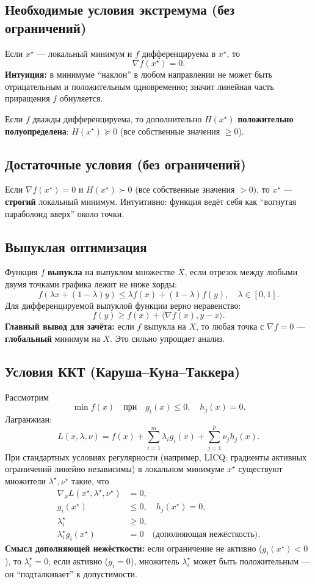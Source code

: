 \documentclass[12pt,a4paper]{article}
\newcommand{\grad}{\nabla}
\begin{document}
\subsection{Необходимые условия экстремума (без ограничений)}
Если \(x^\star\) --- локальный минимум и \(f\) дифференцируема в \(x^\star\), то
\[
  \grad f(x^\star)=0.
\]
\textbf{Интуиция:} в минимуме ``наклон'' в любом направлении не может быть отрицательным и положительным одновременно; значит линейная часть приращения \(f\) обнуляется.

Если \(f\) дважды дифференцируема, то дополнительно \(H(x^\star)\) \textbf{положительно полуопределена}: \(H(x^\star)\succeq 0\) (все собственные значения \(\ge 0\)).

\subsection{Достаточные условия (без ограничений)}
Если \(\grad f(x^\star)=0\) и \(H(x^\star)\succ 0\) (все собственные значения \(>0\)), то \(x^\star\) --- \textbf{строгий} локальный минимум. Интуитивно: функция ведёт себя как ``вогнутая параболоид вверх'' около точки.

\subsection{Выпуклая оптимизация}
Функция \(f\) \textbf{выпукла} на выпуклом множестве \(X\), если отрезок между любыми двумя точками графика лежит не ниже хорды:
\[
  f(\lambda x+(1-\lambda)y)\le \lambda f(x)+(1-\lambda)f(y),\quad \lambda\in[0,1].
\]
Для дифференцируемой выпуклой функции верно неравенство:
\[
  f(y)\ge f(x)+\langle \grad f(x), y-x\rangle.
\]
\textbf{Главный вывод для зачёта:} если \(f\) выпукла на \(X\), то любая точка с \(\grad f=0\) --- \textbf{глобальный} минимум на \(X\). Это сильно упрощает анализ.

\subsection{Условия ККТ (Каруша--Куна--Таккера)}
Рассмотрим
\[
  \min f(x)\quad \text{при}\quad g_i(x)\le 0,\quad h_j(x)=0.
\]
Лагранжиан:
\[
  L(x,\lambda,\nu)= f(x)+\sum_{i=1}^m \lambda_i g_i(x)+\sum_{j=1}^p \nu_j h_j(x).
\]
При стандартных условиях регулярности (например, LICQ: градиенты активных ограничений линейно независимы) в локальном минимуме \(x^\star\) существуют множители \(\lambda^\star,\nu^\star\) такие, что
\begin{align*}
  \grad_x L(x^\star,\lambda^\star,\nu^\star) &= 0,\\
  g_i(x^\star)&\le 0,\quad h_j(x^\star)=0,\\
  \lambda_i^\star &\ge 0,\\
  \lambda_i^\star g_i(x^\star) &= 0\quad\text{(дополняющая нежёсткость)}.
\end{align*}
\textbf{Смысл дополняющей нежёсткости:} если ограничение не активно (\(g_i(x^\star)<0\)), то \(\lambda_i^\star=0\); если активно (\(g_i=0\)), множитель \(\lambda_i^\star\) может быть положительным --- он ``подталкивает'' к допустимости.
\end{document}
